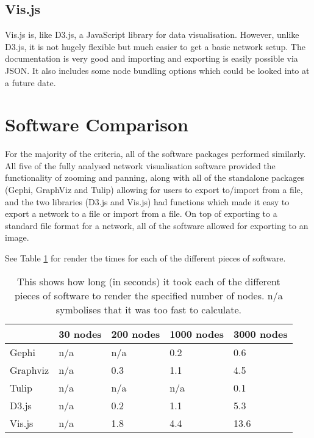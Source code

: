 \documentclass[../dissertation.tex]{subfiles}
\begin{document}
\subsection{Vis.js}

Vis.js is, like D3.js, a JavaScript library for data visualisation. However, unlike D3.js, it is not hugely flexible but much easier to get a basic network setup. The documentation is very good and importing and exporting is easily possible via JSON. It also includes some node bundling options which could be looked into at a future date.

\section{Software Comparison}

For the majority of the criteria, all of the software packages performed similarly. All five of the fully analysed network visualisation software provided the functionality of zooming and panning, along with all of the standalone packages (Gephi, GraphViz and Tulip) allowing for users to export to/import from a file, and the two libraries (D3.js and Vis.js) had functions which made it easy to export a network to a file or import from a file. On top of exporting to a standard file format for a network, all of the software allowed for exporting to an image.

See Table \ref{table:render-times} for render the times for each of the different pieces of software.

\begin{table}[ht]
    \centering
    \begin{tabular}{|l|l|l|l|l|}
        \hline
                 & 30 nodes  & 200 nodes & 1000 nodes & 3000 nodes \\ \hline
        Gephi    & n/a       & n/a       & 0.2        & 0.6        \\ \hline
        Graphviz & n/a       & 0.3       & 1.1        & 4.5        \\ \hline
        Tulip    & n/a       & n/a       & n/a        & 0.1        \\ \hline
        D3.js    & n/a       & 0.2       & 1.1        & 5.3        \\ \hline
        Vis.js   & n/a       & 1.8       & 4.4        & 13.6       \\ \hline
    \end{tabular}
    \caption{This shows how long (in seconds) it took each of the different pieces of software to render the specified number of nodes. n/a symbolises that it was too fast to calculate.}
    \label{table:render-times}
\end{table}
\end{document}

